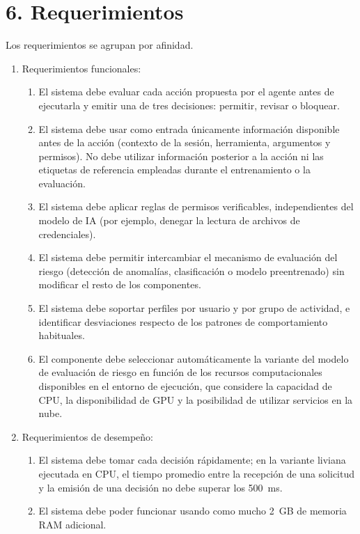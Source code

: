 \documentclass[
11pt, %
]{charter}
\begin{document}
\section{6. Requerimientos}
\label{sec:requerimientos}

Los requerimientos se agrupan por afinidad.

\begin{enumerate}
	\item Requerimientos funcionales:
		\begin{enumerate}
			\item El sistema debe evaluar cada acción propuesta por el agente antes de ejecutarla y emitir una de tres decisiones: permitir, revisar o bloquear.
			\item El sistema debe usar como entrada únicamente información disponible antes de la acción (contexto de la sesión, herramienta, argumentos y permisos). No debe utilizar información posterior a la acción ni las etiquetas de referencia empleadas durante el entrenamiento o la evaluación.
			\item El sistema debe aplicar reglas de permisos verificables, independientes del modelo de IA (por ejemplo, denegar la lectura de archivos de credenciales).
			\item El sistema debe permitir intercambiar el mecanismo de evaluación del riesgo (detección de anomalías, clasificación o modelo preentrenado) sin modificar el resto de los componentes.
			\item El sistema debe soportar perfiles por usuario y por grupo de actividad, e identificar desviaciones respecto de los patrones de comportamiento habituales.
			\item El componente debe seleccionar automáticamente la variante del modelo de evaluación de riesgo en función de los recursos computacionales disponibles en el entorno de ejecución, que considere la capacidad de CPU, la disponibilidad de GPU y la posibilidad de utilizar servicios en la nube.
		\end{enumerate}
	\item Requerimientos de desempeño:
		\begin{enumerate}
			\item El sistema debe tomar cada decisión rápidamente; en la variante liviana ejecutada en CPU, el tiempo promedio entre la recepción de una solicitud y la emisión de una decisión no debe superar los 500~ms.
			\item El sistema debe poder funcionar usando como mucho 2~GB de memoria RAM adicional.

\end{enumerate}
\end{enumerate}
\end{document}
